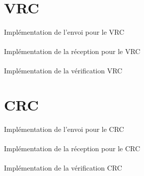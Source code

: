     \section{VRC}

        \paragraph{}
Implémentation de l'envoi pour le VRC


    \clearpage
        \paragraph{}
Implémentation de la réception pour le VRC


    \clearpage
        \paragraph{}
Implémentation de la vérification VRC


    \clearpage

    \section{CRC}

        \paragraph{}
Implémentation de l'envoi pour le CRC


    \clearpage
        \paragraph{}
Implémentation de la réception pour le CRC


    \clearpage
        \paragraph{}
Implémentation de la vérification CRC


    \clearpage{}
